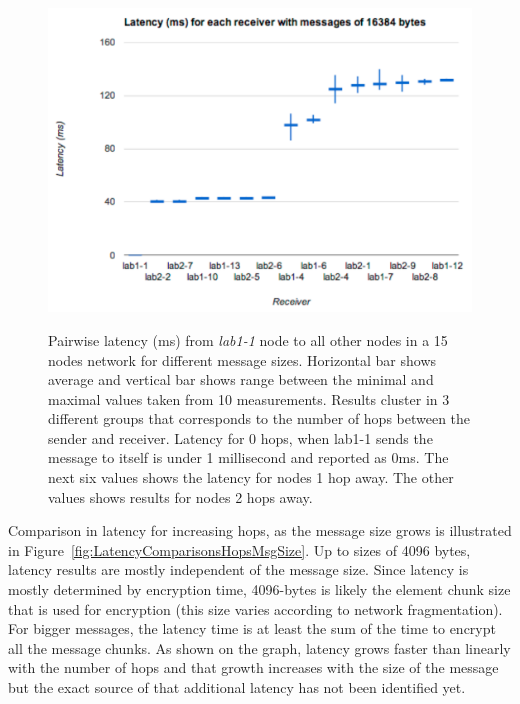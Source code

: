 \begin{figure}
\begin{center}
\begin{minipage}[b]{.5\textwidth}
\end{minipage}
\hfill
\begin{minipage}[b]{\textwidth}
\begin{center}
\includegraphics[width=.5\textwidth]{figures/LatencyPerReceiver-16384b}
\end{center}
\label{fig:LatencyPerReceiver-16384b}
\end{minipage}
\caption[Pairwise latency (ms) from a single node in a 15 nodes network.]{Pairwise latency (ms) from \textit{lab1-1} node to all other nodes in a 15 nodes network for different message sizes. Horizontal bar shows average and vertical bar shows range between the minimal and maximal values taken from 10 measurements. Results cluster in 3 different groups that corresponds to the number of hops between the sender and receiver. Latency for 0 hops, when lab1-1 sends the message to itself is under 1 millisecond and reported as 0ms. The next six values shows the latency for nodes 1 hop away. The other values shows results for nodes 2 hops away.}\label{fig:LatencyPerReceiver}
\end{center}
\end{figure}

Comparison in latency for increasing hops, as the message size grows is illustrated in Figure~\ref{fig:LatencyComparisonsHopsMsgSize}. Up to sizes of 4096 bytes, latency results are mostly independent of the message size. Since latency is mostly determined by encryption time, 4096-bytes is likely the element chunk size that is used for encryption (this size varies according to network fragmentation). For bigger messages, the latency time is at least the sum of the time to encrypt all the message chunks. As shown on the graph, latency grows faster than linearly with the number of hops and that growth increases with the size of the message but the exact source of that additional latency has not been identified yet. 


